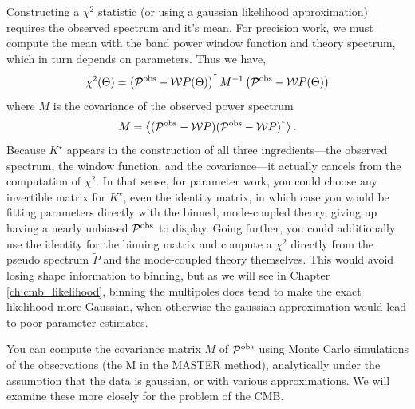 Constructing a $\chi^2$ statistic (or using a gaussian likelihood approximation) requires the observed spectrum and it's mean.  For precision work, we must compute the mean with the band power window function and theory spectrum, which in turn depends on parameters.  Thus we have,
\begin{equation}
  \chi^2(\Theta) = \left({\mathcal P}^{\rm obs} - {\mathcal W} P(\Theta) \right)^\dag
  M^{-1} \left({\mathcal P}^{\rm obs} - {\mathcal W} P(\Theta) \right)  \label{eq:chi2_for_Pobs}
\end{equation}
where $M$ is the covariance of the observed power spectrum
\begin{equation}
  M = \left\langle ({\mathcal P}^{\rm obs}- {\mathcal W} P) ({\mathcal P}^{{\rm obs}}- {\mathcal W} P)^\dag \right\rangle.
\end{equation}
Because $K^\star $ appears in the construction of all three ingredients---the observed spectrum, the window function, and the covariance---it actually cancels from the computation of $\chi^2$.  In that sense, for parameter work, you could choose any invertible matrix for $K^\star $, even the identity matrix, in which case you would be fitting parameters directly with the binned, mode-coupled theory, giving up having a nearly unbiased ${\mathcal P}^{\rm obs}$ to display.  Going further, you could additionally use the identity for the binning matrix and compute a $\chi^2$ directly from the pseudo spectrum $\tilde P$ and the mode-coupled theory themselves.  This would avoid losing shape information to binning, but as we will see in Chapter \ref{ch:cmb_likelihood}, binning the multipoles does tend to make the exact likelihood more Gaussian, when otherwise the gaussian approximation would lead to poor parameter estimates.

You can compute the covariance matrix $M$ of ${\mathcal P}^{\rm obs}$ using Monte Carlo simulations of the observations (the M in the MASTER method), analytically under the assumption that the data is gaussian, or with various approximations.  We will examine these more closely for the problem of the CMB.

\nocite{numerical_recipes,master,namaster}


\exercises

